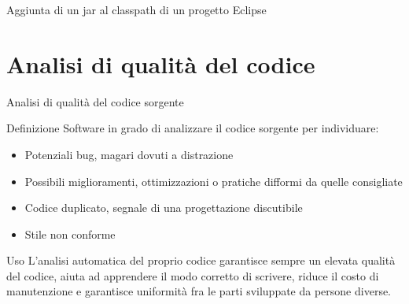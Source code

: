 \documentclass[presentation]{beamer}
\begin{document}
\begin{frame}[allowframebreaks]{Aggiunta di un jar al classpath di un progetto Eclipse}
\begin{center}
	\end{center}
\end{frame}

\section{Analisi di qualità del codice}

\begin{frame}{Analisi di qualità del codice sorgente}
	\begin{block}{Definizione}
		Software in grado di analizzare il codice sorgente per individuare:
		\begin{itemize}
			\item Potenziali bug, magari dovuti a distrazione
			\item Possibili miglioramenti, ottimizzazioni o pratiche difformi da quelle consigliate
			\item Codice duplicato, segnale di una progettazione discutibile
			\item Stile non conforme
		\end{itemize}
	\end{block}
	\begin{block}{Uso}
		L'analisi automatica del proprio codice garantisce sempre un elevata qualità del codice, aiuta ad apprendere il modo corretto di scrivere, riduce il costo di manutenzione e garantisce uniformità fra le parti sviluppate da persone diverse.
	\end{block}
\end{frame}
\end{document}
